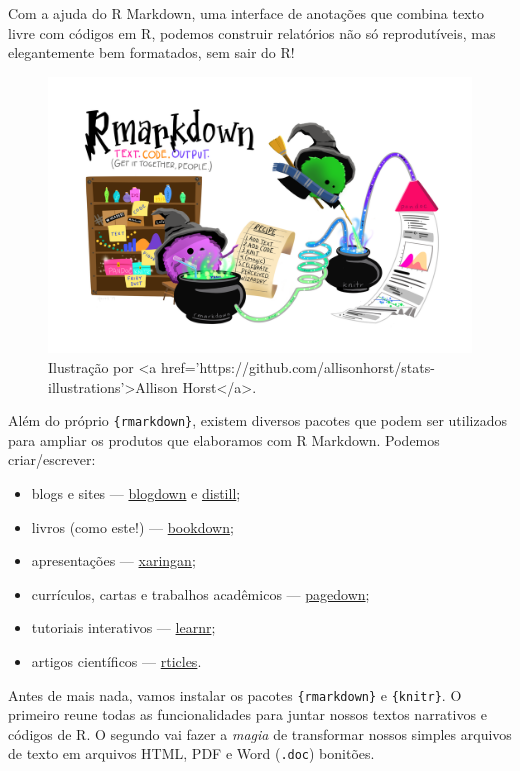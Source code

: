 \documentclass[
]{book}
\begin{document}
Com a ajuda do R Markdown, uma interface de anotações que combina texto livre com códigos em R, podemos construir relatórios não só reprodutíveis, mas elegantemente bem formatados, sem sair do R!

\begin{figure}

{\centering \includegraphics[width=0.8\linewidth]{assets/img/relatorios/rmarkdown_wizards} 

}

\caption{Ilustração por <a href='https://github.com/allisonhorst/stats-illustrations'>Allison Horst</a>.}\label{fig:unnamed-chunk-1}
\end{figure}

Além do próprio \texttt{\{rmarkdown\}}, existem diversos pacotes que podem ser utilizados para ampliar os produtos que elaboramos com R Markdown. Podemos criar/escrever:

\begin{itemize}
\item
  blogs e sites --- \href{https://bookdown.org/yihui/blogdown/}{blogdown} e \href{https://rstudio.github.io/distill/}{distill};
\item
  livros (como este!) --- \href{https://bookdown.org/}{bookdown};
\item
  apresentações --- \href{https://github.com/yihui/xaringan}{xaringan};
\item
  currículos, cartas e trabalhos acadêmicos --- \href{https://github.com/rstudio/pagedown}{pagedown};
\item
  tutoriais interativos --- \href{https://rstudio.github.io/learnr/}{learnr};
\item
  artigos científicos --- \href{https://github.com/rstudio/rticles}{rticles}.
\end{itemize}

Antes de mais nada, vamos instalar os pacotes \texttt{\{rmarkdown\}} e \texttt{\{knitr\}}. O primeiro reune todas as funcionalidades para juntar nossos textos narrativos e códigos de R. O segundo vai fazer a \emph{magia} de transformar nossos simples arquivos de texto em arquivos HTML, PDF e Word (\texttt{.doc}) bonitões.
\end{document}
